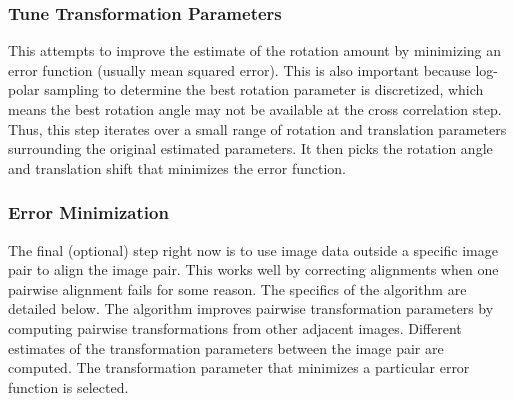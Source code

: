 \documentclass{article}
\begin{document}
\subsubsection{Tune Transformation Parameters}
This attempts to improve the estimate of the rotation amount by minimizing an error function (usually mean squared error). This is also important because log-polar sampling to determine the best rotation parameter is discretized, which means the best rotation angle may not be available at the cross correlation step. Thus, this step iterates over a small range of rotation and translation parameters surrounding the original estimated parameters. It then picks the rotation angle and translation shift that minimizes the error function.

\subsubsection{Error Minimization}
The final (optional) step right now is to use image data outside a specific image pair to align the image pair. This works well by correcting alignments when one pairwise alignment fails for some reason. The specifics of the algorithm are detailed below. The algorithm improves pairwise transformation parameters by computing pairwise transformations from other adjacent images. Different estimates of the transformation parameters between the image pair are computed. The transformation parameter that minimizes a particular error function is selected. \\
\end{document}
